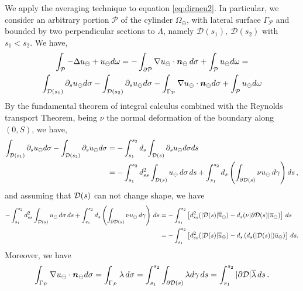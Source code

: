 We apply the averaging technique to equation \eqref{eq:dirneu2}. In particular, we consider an arbitrary portion $\mathcal{P}$ of the cylinder $\Omega_\ominus$, with lateral surface $\Gamma _{\mathcal{P}}$ and bounded by two perpendicular sections to $\Lambda$, namely $\mathcal{D}(s_1), \ \mathcal{D}(s_2)$ with $s_1<s_2$. We have,
\begin{multline*}
\int_{\mathcal{P}} -\Delta u_{\ominus} + u_{\ominus} d\omega =
-\int_{\partial \mathcal{P}} \nabla u_{\ominus} \cdot \boldsymbol n_{\ominus} \, d\sigma  + \int_{\mathcal{P}}u_{\ominus} d\omega=
\\
 \int_{\mathcal{D}(s_1)} \partial_s u_{\ominus} d\sigma -  \int_{\mathcal{D}(s_2)} \partial_s u_{\ominus} d\sigma -  \int_{\Gamma_{\mathcal{P}}} \nabla u_{\ominus} \cdot \boldsymbol n_{\ominus} d\sigma +\int_{\mathcal{P}}u_{\ominus} d\omega
\end{multline*}
By the fundamental theorem of integral calculus combined with the Reynolds transport Theorem, 
being $\nu$ the normal deformation of the boundary along $(0,S)$, we have,
\begin{equation*}
\begin{split}
\int_{\mathcal{D}(s_1)} \partial_s u_{\ominus} d\sigma -  \int_{\mathcal{D}(s_2)} \partial_s u_{\ominus} d\sigma 
&= -\int_{s_1}^{s_2} d_s \int_{\mathcal{D}(s)}  \partial_s u_{\ominus} d\sigma ds
\\
&= -\int_{s_1}^{s_2} d_{ss}^2 \int_{\mathcal{D}(s)} u_{\ominus} \, d\sigma \, ds +  \int_{s_1}^{s_2} d_s \left( \int_{\partial\mathcal{D}(s)} \nu u_{\ominus} \, d\gamma \right) ds\,,
\end{split}
\end{equation*}
and assuming that $\mathcal{D}(s)$  can not change shape, we have
\begin{equation*}
\begin{split}
-\int_{s_1}^{s_2} d_{ss}^2 \int_{\mathcal{D}(s)} u_{\ominus} \, d\sigma \, ds + \int_{s_1}^{s_2} d_s \left( \int_{\partial\mathcal{D}(s)} \nu u_{\ominus} \, d\gamma \right)\, ds
&=-\int_{s_1}^{s_2} \left[d_{ss}^2 (|\mathcal{D}(s)|\overline{\overline{u}}_{\ominus}) -  d_s(  \nu |\partial\mathcal{D}(s)| \overline{u}_{\ominus} ) \right] \, ds
\\
&=-\int_{s_1}^{s_2} \left[d_{ss}^2 (|\mathcal{D}(s)|\overline{\overline{u}}_{\ominus}) -  d_s\left(d_s(|\mathcal{D}(s)|) \overline{u}_{\ominus} \right) \right] \, ds.
\end{split}
\end{equation*}
Moreover, we have
\begin{equation*}
\int_{\Gamma_{\mathcal{P}}} \nabla u_{\ominus} \cdot \boldsymbol n_{\ominus} d\sigma =  \int_{\Gamma_{\mathcal{P}}} \lambda \, d\sigma
=  \int_{s_1}^{s_2} \int_{\partial\mathcal{D}(s)} \lambda d\gamma \, ds 
= \int_{s_1}^{s_2} |\partial\mathcal{D}| \overline{\lambda} \,ds\,.
\end{equation*}
